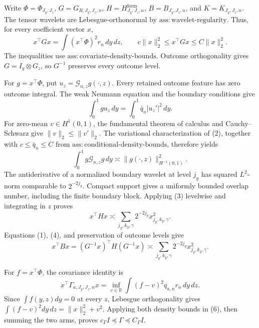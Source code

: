 Write \(\Phi=\Phi_{J_y,J_z}\), \(G=G_{R,J_y,J_z,n}\), \(H=H^{\mathrm{form}}_{J_y,J_z,n}\), \(B=B_{J_y,J_z,n}\), and \(K=K_{J_y,J_z,n}\). The tensor wavelets are Lebesgue-orthonormal by \(\mathrm{ass{:}wavelet\text{-}regularity}\). Thus, for every coefficient vector \(x\),
\[
x^\top Gx=\int(x^\top\Phi)^2r_n\,dy\,dz,
\qquad c\|x\|_2^2\le x^\top Gx\le C\|x\|_2^2.                 \tag{1}
\]
The inequalities use \(\mathrm{ass{:}covariate\text{-}density\text{-}bounds}\). Outcome orthogonality gives \(G=I_y\otimes G_z\), so \(G^{-1}\) preserves every outcome level.

For \(g=x^\top\Phi\), put \(u_z=\mathcal G_{n,z}g(\cdot,z)\). Every retained outcome feature has zero outcome integral. The weak Neumann equation and the boundary conditions give
\[
\int_0^1g u_z\,dy=\int_0^1\bar q_n|u_z'|^2\,dy.                 \tag{2}
\]
For zero-mean \(v\in H^1(0,1)\), the fundamental theorem of calculus and Cauchy--Schwarz give \(\|v\|_2\le\|v'\|_2\). The variational characterization of (2), together with \(c\le\bar q_n\le C\) from \(\mathrm{ass{:}conditional\text{-}density\text{-}bounds}\), therefore yields
\[
\int_0^1g\mathcal G_{n,z}g\,dy\asymp\|g(\cdot,z)\|_{H^{-1}(0,1)}^2. \tag{3}
\]
The antiderivative of a normalized boundary wavelet at level \(j_y\) has squared \(L^2\)-norm comparable to \(2^{-2j_y}\). Compact support gives a uniformly bounded overlap number, including the finite boundary block. Applying (3) levelwise and integrating in \(z\) proves
\[
x^\top Hx\asymp\sum_{j_y,k_y,\gamma}2^{-2j_y}x_{j_y,k_y,\gamma}^2. \tag{4}
\]
Equations (1), (4), and preservation of outcome levels give
\[
x^\top Bx=(G^{-1}x)^\top H(G^{-1}x)
\asymp\sum_{j_y,k_y,\gamma}2^{-2j_y}x_{j_y,k_y,\gamma}^2.       \tag{5}
\]

For \(f=x^\top\Phi\), the covariance identity is
\[
x^\top\Gamma_{a,J_y,J_z,n}x
=\inf_{v\in\mathbb R}\int(f-v)^2q_{a,n}r_n\,dy\,dz.             \tag{6}
\]
Since \(\int f(y,z)dy=0\) at every \(z\), Lebesgue orthogonality gives \(\int(f-v)^2dy\,dz=\|x\|_2^2+v^2\). Applying both density bounds in (6), then summing the two arms, proves \(c_\Gamma I\preceq\Gamma\preceq C_\Gamma I\).

